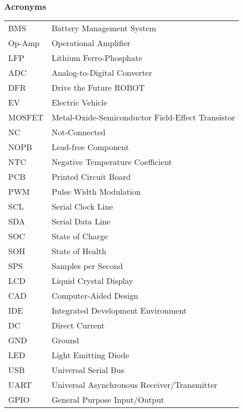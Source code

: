 \subsubsection*{Acronyms}
\begingroup
\renewcommand{\arraystretch}{1.2}
\begin{tabular}{@{}p{2.5cm} l}
    BMS & Battery Management System \\
    Op-Amp & Operational Amplifier \\
    LFP & Lithium Ferro-Phosphate \\
    ADC & Analog-to-Digital Converter \\
    DFR & Drive the Future ROBOT \\
    EV & Electric Vehicle \\
    MOSFET & Metal-Oxide-Semiconductor Field-Effect Transistor \\
    NC & Not-Connected \\
    NOPB & Lead-free Component \\
    NTC & Negative Temperature Coefficient \\
    PCB & Printed Circuit Board \\
    PWM & Pulse Width Modulation \\
    SCL & Serial Clock Line \\
    SDA & Serial Data Line \\
    SOC & State of Charge \\
    SOH & State of Health \\
    SPS & Samples per Second \\
    LCD & Liquid Crystal Display \\
    CAD & Computer-Aided Design \\
    IDE & Integrated Development Environment \\
    DC & Direct Current \\
    GND & Ground \\
    LED & Light Emitting Diode \\
    USB & Universal Serial Bus \\
    UART & Universal Asynchronous Receiver/Transmitter \\
    GPIO & General Purpose Input/Output \\

\end{tabular}
\endgroup
